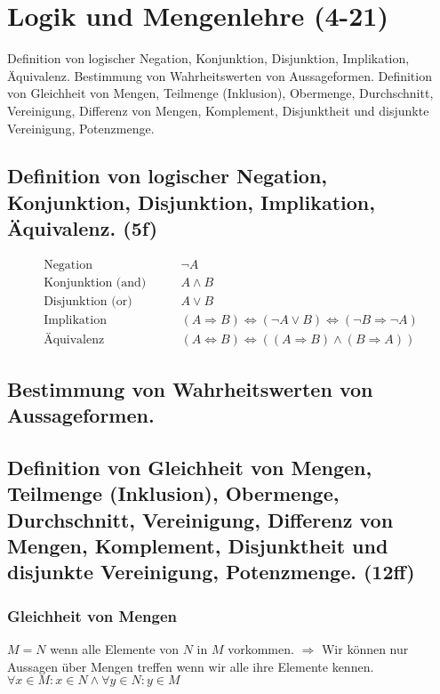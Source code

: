 \section{Logik und Mengenlehre (4-21)}
Definition von logischer Negation, Konjunktion, Disjunktion, Implikation, Äquivalenz. Bestimmung von Wahrheitswerten von Aussageformen. Definition von Gleichheit von Mengen, Teilmenge (Inklusion), Obermenge, Durchschnitt, Vereinigung, Differenz von Mengen, Komplement, Disjunktheit und disjunkte Vereinigung, Potenzmenge. 
\subsection{Definition von logischer Negation, Konjunktion, Disjunktion, Implikation, Äquivalenz. (5f)}
\begin{equation}
\begin{split}
\text{Negation} \qquad & \neg A \\
\text{Konjunktion (and)}  \qquad & A \wedge B \\
\text{Disjunktion (or)}  \qquad & A \vee B \\
\text{Implikation}  \qquad & (A \Rightarrow B) \Leftrightarrow (\neg A \vee B) \Leftrightarrow (\neg B \Rightarrow \neg A) \\
\text{Äquivalenz}  \qquad & (A \Leftrightarrow B) \Leftrightarrow ((A \Rightarrow B) \wedge (B \Rightarrow A))
\end{split}
\end{equation}

\subsection{Bestimmung von Wahrheitswerten von Aussageformen.}

\subsection{Definition von Gleichheit von Mengen, Teilmenge (Inklusion), Obermenge, Durchschnitt, Vereinigung, Differenz von Mengen, Komplement, Disjunktheit und disjunkte Vereinigung, Potenzmenge. (12ff)}
\subsubsection{Gleichheit von Mengen}
$M = N$ wenn alle Elemente von $N$ in $M$ vorkommen. $\Rightarrow$ Wir können nur Aussagen über Mengen treffen wenn wir alle ihre Elemente kennen. $\forall x \in M: x \in N \wedge \forall y \in N: y \in M$
